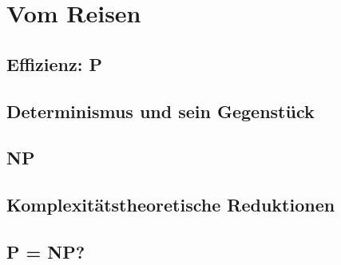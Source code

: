 \chapter{Vom Reisen}
\section{Effizienz: P}
\section{Determinismus und sein Gegenstück}
\section{NP}
\section{Komplexitätstheoretische Reduktionen}
\section{P = NP?}
